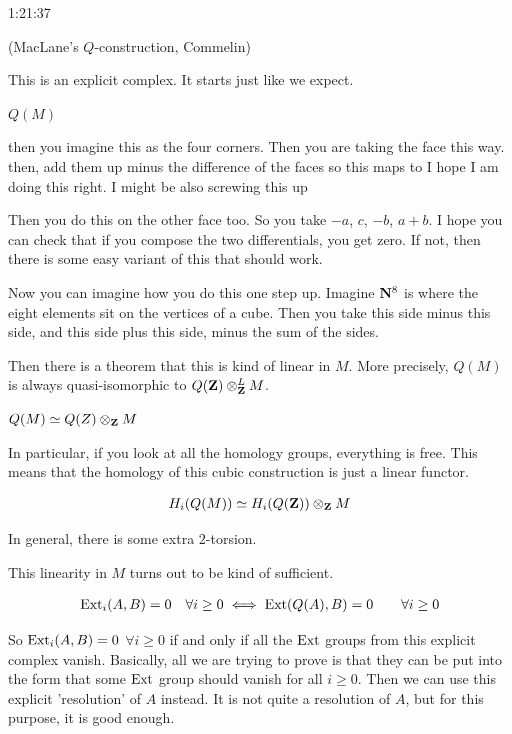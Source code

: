 \begin{unfinished}{1:21:37}


\begin{variant} \label{variant:04-maclane}
(MacLane's $Q$-construction, Commelin)


\end{variant}

This is an explicit complex. It starts just like we expect.

$Q(M)$

then you imagine this as the four corners.
Then you are taking the face this way.
then, add them up minus the difference of the faces
so this maps to %
I hope I am doing this right. I might be also screwing this up 

Then you do this on the other face too. So you take $-a$, $c$, $-b$, $a+b$. I hope you can check that if you compose the two differentials, you get zero. If not, then there is some easy variant of this that should work.

Now you can imagine how you do this one step up. Imagine $\mathbf N^8$ is where the eight elements sit on the vertices of a cube. Then you take this side minus this side, and this side plus this side, minus the sum of the sides.

Then there is a theorem that this is kind of linear in $M$. More precisely, $Q(M)$ is always quasi-isomorphic to $Q(\mathbf Z) \otimes^L_\mathbf Z M$. 

\begin{theorem}
$Q(M) \simeq Q(Z) \otimes_\mathbf Z M $
\end{theorem}

In particular, if you look at all the homology groups, everything is free. This means that the homology of this cubic construction is just a linear functor.

\begin{align*}
H_i(Q(M)) \simeq H_i(Q(\mathbf Z)) \otimes_\mathbf Z M
\end{align*}

 In general, there is some extra $2$-torsion.

This linearity in $M$ turns out to be kind of sufficient. 

\begin{align*}
	\operatorname{Ext}_i(A,B)=0 \quad & \forall i \geq 0 \iff \operatorname{Ext}(Q(A),B) = 0 \quad & \forall i \geq 0
\end{align*}

So $\operatorname{Ext}_i(A,B)=0$ $\forall i \geq 0$ if and only if all the $\operatorname{Ext}$ groups from this explicit complex vanish. Basically, all we are trying to prove is that they can be put into the form that some $\operatorname{Ext}$ group should vanish for all $i \geq 0$. Then we can use this explicit 'resolution' of $A$ instead. 
It is not quite a resolution of $A$, but for this purpose, it is good enough.


\end{unfinished}
